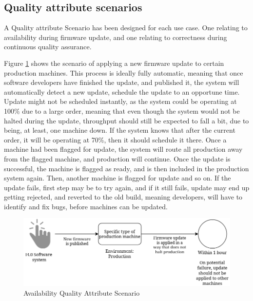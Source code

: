 \subsection{Quality attribute scenarios}
\label{sec:qas}

A Quality attribute Scenario has been designed for each use case. One relating to availability during firmware update, and one relating to correctness during continuous quality assurance.

Figure \ref{fig:AQAS} shows the scenario of applying a new firmware update to certain production machines. This process is ideally fully automatic, meaning that once software developers have finished the update, and published it, the system will automatically detect a new update, schedule the update to an opportune time. Update might not be scheduled instantly, as the system could be operating at 100\% due to a large order, meaning that even though the system would not be halted during the update, throughput should still be expected to fall a bit, due to being, at least, one machine down. If the system knows that after the current order, it will be operating at 70\%, then it should schedule it there. Once a machine had been flagged for update, the system will route all production away from the flagged machine, and production will continue. Once the update is successful, the machine is flagged as ready, and is then included in the production system again. Then, another machine is flagged for update and so on. If the update fails, first step may be to try again, and if it still fails, update may end up getting rejected, and reverted to the old build, meaning developers, will have to identify and fix bugs, before machines can be updated.

\begin{figure}[h]
    \centering
    \includegraphics[width=\linewidth]{Images/Availibility.png}
    \caption{Availability Quality Attribute Scenario}
    \label{fig:AQAS}
\end{figure}


